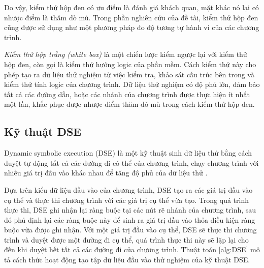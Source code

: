 Do vậy, kiểm thử hộp đen có ưu điểm là đánh giá khách quan, mặt khác
nó lại có nhược điểm là thăm dò mù. Trong phần nghiên cứu của đề tài,
kiểm thử hộp đen cũng được sử dụng như một phương pháp đo độ tương tự
hành vi của các chương trình.
		
\emph{Kiểm thử hộp trắng (white box)} là một chiến lược kiểm ngược lại
với kiểm thử hộp đen, còn gọi là kiểm thử hướng logic của phần
mềm. Cách kiểm thử này cho phép tạo ra dữ liệu thử nghiệm từ việc kiểm
tra, khảo sát cấu trúc bên trong và kiểm thử tính logic của chương
trình. Dữ liệu thử nghiệm có độ phủ lớn, đảm bảo tất cả các đường dẫn,
hoặc các nhánh của chương trình được thực hiện ít nhất một lần, khắc
phục được nhược điểm thăm dò mù trong cách kiểm thử hộp đen.			

\subsection{Kỹ thuật DSE}
\label{sec:dse}

Dynamic symbolic execution (DSE) là một kỹ thuật sinh dữ liệu thử bằng
cách duyệt tự động tất cả các đường đi có thể của chương trình, chạy 
chương trình với nhiều giá trị đầu vào khác nhau để tăng độ
phủ của dữ liệu thử \cite{xie2009fitness,cadar2013symbolic}.

Dựa trên kiểu dữ liệu đầu vào của chương trình, DSE tạo ra các giá trị 
đầu vào cụ thể và thực thi chương trình với các giá trị cụ thể vừa tạo. 
Trong quá trình thực thi, DSE ghi nhận lại ràng buộc tại các nút rẽ nhánh 
của chương trình, sau đó phủ định lại các ràng buộc này để sinh ra giá 
trị đầu vào thỏa điều kiện ràng buộc vừa được ghi nhận. Với một giá trị 
đầu vào cụ thể, DSE sẽ thực thi chương trình và duyệt được một đường đi 
cụ thể, quá trình thực thi này sẽ lặp lại cho đến khi duyệt hết tất cả 
các đường đi của chương trình. Thuật toán \ref{alg:DSE} mô tả cách thức hoạt
động tạo tập dữ liệu đầu vào thử nghiệm của kỹ thuật DSE.

